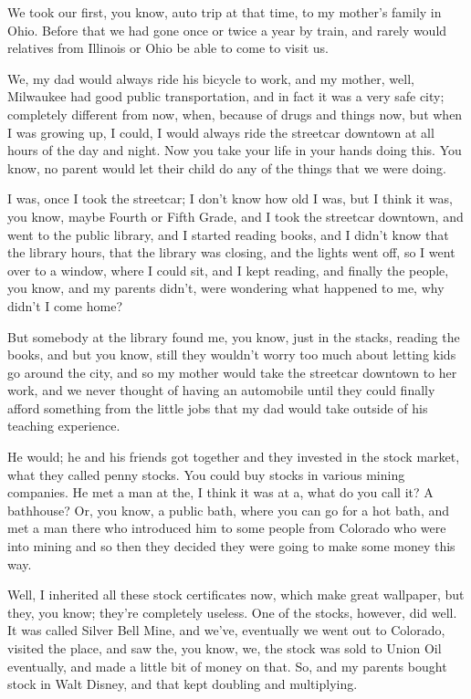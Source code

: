 \documentclass[]{article}
\begin{document}
We took our first, you know, auto trip at that time, to my mother's
family in Ohio. Before that we had gone once or twice a year by train,
and rarely would relatives from Illinois or Ohio be able to come to
visit us.

We, my dad would always ride his bicycle to work, and my mother, well,
Milwaukee had good public transportation, and in fact it was a very safe
city; completely different from now, when, because of drugs and things
now, but when I was growing up, I could, I would always ride the
streetcar downtown at all hours of the day and night. Now you take your
life in your hands doing this. You know, no parent would let their child
do any of the things that we were doing.

I was, once I took the streetcar; I don't know how old I was, but I
think it was, you know, maybe Fourth or Fifth Grade, and I took the
streetcar downtown, and went to the public library, and I started
reading books, and I didn't know that the library hours, that the
library was closing, and the lights went off, so I went over to a
window, where I could sit, and I kept reading, and finally the people,
you know, and my parents didn't, were wondering what happened to me, why
didn't I come home?

But somebody at the library found me, you know, just in the stacks,
reading the books, and but you know, still they wouldn't worry too much
about letting kids go around the city, and so my mother would take the
streetcar downtown to her work, and we never thought of having an
automobile until they could finally afford something from the little
jobs that my dad would take outside of his teaching experience.

He would; he and his friends got together and they invested in the stock
market, what they called penny stocks. You could buy stocks in various
mining companies. He met a man at the, I think it was at a, what do you
call it? A bathhouse? Or, you know, a public bath, where you can go for
a hot bath, and met a man there who introduced him to some people from
Colorado who were into mining and so then they decided they were going
to make some money this way.

Well, I inherited all these stock certificates now, which make great
wallpaper, but they, you know; they're completely useless. One of the
stocks, however, did well. It was called Silver Bell Mine, and we've,
eventually we went out to Colorado, visited the place, and saw the, you
know, we, the stock was sold to Union Oil eventually, and made a little
bit of money on that. So, and my parents bought stock in Walt Disney,
and that kept doubling and multiplying.
\end{document}
